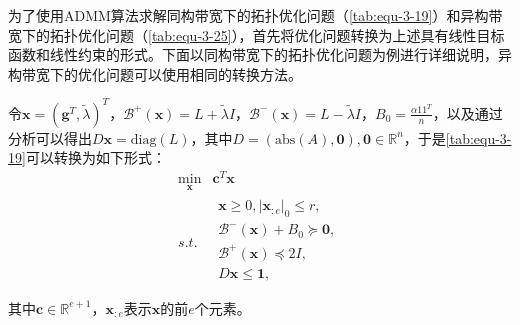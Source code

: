 为了使用ADMM算法求解同构带宽下的拓扑优化问题（\autoref{tab:equ-3-19}）和异构带宽下的拓扑优化问题（\autoref{tab:equ-3-25}），首先将优化问题转换为上述具有线性目标函数和线性约束的形式。下面以同构带宽下的拓扑优化问题为例进行详细说明，异构带宽下的优化问题可以使用相同的转换方法。

令$\mathbf{x}=\left( \mathbf{g}^T,\tilde{\lambda} \right) ^T$，$\mathcal{B} ^+\left( \mathbf{x} \right) =L+\tilde{\lambda} I$，$\mathcal{B} ^-\left( \mathbf{x} \right) =L-\tilde{\lambda} I$，$B_0=\frac{\alpha 11^T}{n}$，以及通过分析可以得出$D\mathbf{x}=\mathrm{diag}\left( L \right) $，其中$ D=\left( \mathrm{abs} \left( A \right) ,\mathbf{0} \right) ,\mathbf{0}\in \mathbb{R} ^n$，于是\autoref{tab:equ-3-19}可以转换为如下形式：
\begin{equation}
    \label{tab:equ-3-37}
    \begin{matrix}
        \underset{\mathbf{x}}{\min}&		\boldsymbol{c}^T\mathbf{x}\\
        s.t.&		\begin{array}{c}
        \mathbf{x}\ge 0,|\mathbf{x}_{:e}|_0\le r,\\
        \mathcal{B} ^-\left( \mathbf{x} \right) +B_0\succeq \mathbf{0},\\
        \mathcal{B} ^+\left( \mathbf{x} \right) \preceq 2 I,\\
        D\mathbf{x}\leqslant \mathbf{1},\\
    \end{array}\\
    \end{matrix}
\end{equation}
其中$\boldsymbol{c}\in \mathbb{R} ^{e+1}$，$\mathbf{x}_{:e}$表示$\mathbf{x}$的前$e$个元素。

